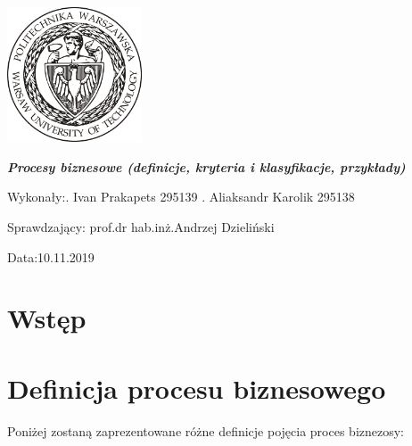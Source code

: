 \documentclass[a4paper, 12pt]{article}
\newcommand{\mainmatter}{\clearpage \cfoot{\thepage\ of \pageref{LastPage}}
\pagenumbering{arabic}}
\begin{document}
	\begin{titlepage}
\includegraphics[width = 40mm]{logo.jpg}
		\begin{center}
    			\vspace{3cm}
    					\Large\textit{\textbf{Procesy biznesowe (definicje, kryteria i klasyfikacje, przykłady)}}
   			\vspace{4cm}
		\end{center} 

		\hfill\begin{minipage}{0.54\textwidth}
			\Large Wykonały:. Ivan Prakapets 295139 . Aliaksandr Karolik 295138
		\vspace{\baselineskip}
		\end{minipage}
		
		\hfill\begin{minipage}{0.54\textwidth}
			\Large Sprawdzający:\newline
		 		prof.dr hab.inż.Andrzej Dzieliński
\vspace{\baselineskip}
		\end{minipage}

		\hfill\begin{minipage}{0.54\textwidth}
			\Large Data:10.11.2019
			\vspace{\baselineskip}
		\end{minipage}
	\end{titlepage}
\newpage
\mainmatter
\setlength{\headheight}{15pt}
\doublespacing
\tableofcontents
\newpage

\linespread{0.5}

\section{Wstęp}

\section{Definicja procesu biznesowego}
\hspace*{1.5 cm}Poniżej zostaną zaprezentowane różne definicje pojęcia proces biznezosy:
\end{document}

